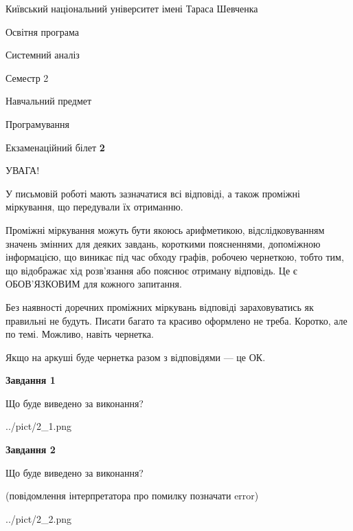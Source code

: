 \documentclass[12pt, ukrainian]{article}
\begin{document}
{{\begin {small}\par
{ \center  Київський національний університет імені Тараса Шевченка \par}
{\parbox {5 cm}{Освітня програма \hfill}{\parbox {7 cm}{Системний аналіз \hfill}}\parbox {6 cm}{\hfill Семестр 2}}\par
{\parbox {5 cm} {Навчальний предмет \hfill}\parbox {7 cm}{Програмування \hfill}\parbox {6cm}{\hfill}\par}\vspace{-7pt} \end{small}}{\center Екзаменаційний білет \No \textbf
{ 2 }\par}}
{
\begin {large}
УВАГА!

У письмовій роботі мають зазначатися всі відповіді, а також проміжні міркування, що передували їх отриманню.

Проміжні міркування можуть бути якоюсь арифметикою, відслідковуванням зна\-чень змінних для деяких завдань,
короткими поясненнями, допоміжною інформацією, що виникає під час обходу графів, робочею чернеткою,
тобто тим, що відображає хід розв’язання або пояснює отриману відповідь.
Це є ОБОВ’ЯЗКОВИМ для кожного запитання.

Без наявності доречних проміжних міркувань відповіді зараховуватись як правиль\-ні не будуть.
Писати багато та красиво оформлено не треба. Коротко, але по темі. Можли\-во, навіть чернетка.

Якщо на аркуші буде чернетка разом з відповідями --- це ОК.

\newpage

{\begin {center}\textbf{Завдання 1}\end {center}}\par
Що буде виведено за виконання?\par
\begin{center}
	{../pict/2_1.png}
\end{center}
\newpage

{\begin {center}\textbf{Завдання 2}\end {center}}\par
Що буде виведено за виконання?\par
 (повідомлення інтерпретатора про помилку позначати error)\par
\begin{center}
	{../pict/2_2.png}
\end{center}
\newpage


\end{large}}
\end{document}
